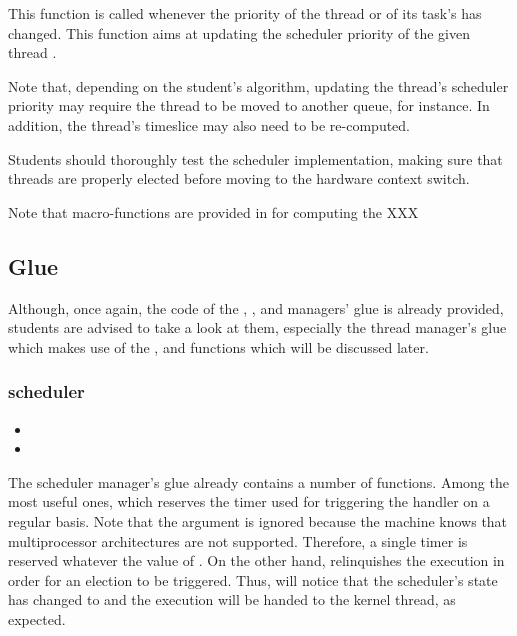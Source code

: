          {
           This function is called whenever the priority of the thread
           or of its task's has changed. This function aims at updating
           the scheduler priority of the given thread .

           \-

           Note that, depending on the student's algorithm, updating the
           thread's scheduler priority may require the thread to be moved
           to another queue, for instance. In addition, the thread's
           timeslice may also need to be re-computed.
         }

Students should thoroughly test the scheduler implementation, making
sure that threads are properly elected before moving to the hardware
context switch.

Note that macro-functions are provided in
 for computing the
XXX

%
%

\subsection{Glue}

Although, once again, the code of the , , and
 managers' glue is already provided, students are advised
to take a look at them, especially the thread manager's glue which makes
use of the ,  and
 functions which will be discussed later.

\subsubsection*{scheduler}

\begin{itemize}
  \item
  \item
\end{itemize}

The scheduler manager's glue already contains a number of functions. Among
the most useful ones,  which reserves the
timer used for triggering the  handler on
a regular basis. Note that the  argument is ignored because
the machine knows that multiprocessor architectures are not supported.
Therefore, a single timer is reserved whatever the value of .
On the other hand,  relinquishes the execution
in order for an election to be triggered. Thus, 
will notice that the scheduler's state has changed to 
and the execution will be handed to the kernel thread, as expected.

